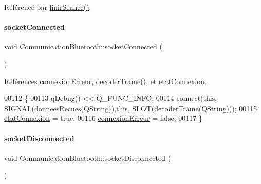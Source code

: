 Référencé par \hyperlink{class_communication_bluetooth_ab2170ef9c868ac2a26b76675c71f770e}{finir\+Seance()}.

\mbox{\label{class_communication_bluetooth_ab4b02673b1d6ffd5970f9546360b25e7}} 
\paragraph{\texorpdfstring{socket\+Connected}{socketConnected}}
{\footnotesize\ttfamily void Communication\+Bluetooth\+::socket\+Connected (\begin{DoxyParamCaption}{ }\end{DoxyParamCaption})\hspace{0.3cm}{\ttfamily [slot]}}



Références \hyperlink{class_communication_bluetooth_a7b313bd3b054faaf59244a297880bf7a}{connexion\+Erreur}, \hyperlink{class_communication_bluetooth_a6b53f12131d9323cec8f2a03fe716e6a}{decoder\+Trame()}, et \hyperlink{class_communication_bluetooth_ae6ab740d6e6673fcc9a9f141bd295bc4}{etat\+Connexion}.


\begin{DoxyCode}
00112 \{
00113     qDebug() << Q\_FUNC\_INFO;
00114     connect(\textcolor{keyword}{this}, SIGNAL(donneesRecues(QString)),\textcolor{keyword}{this}, SLOT(\hyperlink{class_communication_bluetooth_a6b53f12131d9323cec8f2a03fe716e6a}{decoderTrame}(QString)));
00115     \hyperlink{class_communication_bluetooth_ae6ab740d6e6673fcc9a9f141bd295bc4}{etatConnexion} = \textcolor{keyword}{true};
00116     \hyperlink{class_communication_bluetooth_a7b313bd3b054faaf59244a297880bf7a}{connexionErreur} = \textcolor{keyword}{false};
00117 \}
\end{DoxyCode}
\mbox{\label{class_communication_bluetooth_a87e96f5362c1334adb3c930566ca9b88}} 
\paragraph{\texorpdfstring{socket\+Disconnected}{socketDisconnected}}
{\footnotesize\ttfamily void Communication\+Bluetooth\+::socket\+Disconnected (\begin{DoxyParamCaption}{ }\end{DoxyParamCaption})\hspace{0.3cm}{\ttfamily [slot]}}




